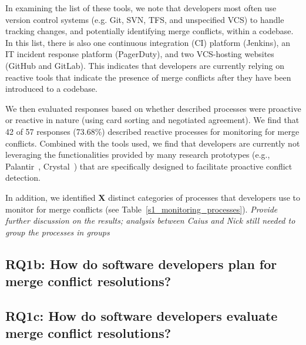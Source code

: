 In examining the list of these tools, we note that developers most often use version control systems (e.g. Git, SVN, TFS, and unspecified VCS) to handle tracking changes, and potentially identifying merge conflicts, within a codebase.
In this list, there is also one continuous integration (CI) platform (Jenkins), an IT incident response platform (PagerDuty), and two VCS-hosting websites (GitHub and GitLab).
This indicates that developers are currently relying on reactive tools that indicate the presence of merge conflicts after they have been introduced to a codebase.

We then evaluated responses based on whether described processes were proactive or reactive in nature (using card sorting and negotiated agreement).
We find that 42 of 57 responses (73.68\%) described reactive processes for monitoring for merge conflicts.
Combined with the tools used, we find that developers are currently not leveraging the functionalities provided by many research prototypes (e.g., Palantir~\cite{palantir}, Crystal~\cite{Brun2011}) that are specifically designed to facilitate proactive conflict detection.

In addition, we identified \textbf{X} distinct categories of processes that developers use to monitor for merge conflicts (see Table~\ref{s1_monitoring_processes}).
 \textit{Provide further discussion on the results; analysis between Caius and Nick still needed to group the processes in groups}

\subsection{\textbf{RQ1b:} How do software developers plan for merge conflict resolutions?}\label{RQ1b}

\subsection{\textbf{RQ1c:} How do software developers evaluate merge conflict resolutions?}\label{RQ1c}